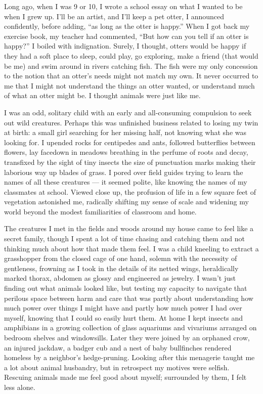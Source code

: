 Long ago, when I was 9 or 10, I wrote a school essay on what I wanted to
be when I grew up. I'll be an artist, and I'll keep a pet otter, I
announced confidently, before adding, ``as long as the otter is happy.''
When I got back my exercise book, my teacher had commented, ``But how
can you tell if an otter is happy?'' I boiled with indignation. Surely,
I thought, otters would be happy if they had a soft place to sleep,
could play, go exploring, make a friend (that would be me) and swim
around in rivers catching fish. The fish were my only concession to the
notion that an otter's needs might not match my own. It never occurred
to me that I might not understand the things an otter wanted, or
understand much of what an otter might be. I thought animals were just
like me.

I was an odd, solitary child with an early and all-consuming compulsion
to seek out wild creatures. Perhaps this was unfinished business related
to losing my twin at birth: a small girl searching for her missing half,
not knowing what she was looking for. I upended rocks for centipedes and
ants, followed butterflies between flowers, lay facedown in meadows
breathing in the perfume of roots and decay, transfixed by the sight of
tiny insects the size of punctuation marks making their laborious way up
blades of grass. I pored over field guides trying to learn the names of
all these creatures --- it seemed polite, like knowing the names of my
classmates at school. Viewed close up, the profusion of life in a few
square feet of vegetation astonished me, radically shifting my sense of
scale and widening my world beyond the modest familiarities of classroom
and home.

The creatures I met in the fields and woods around my house came to feel
like a secret family, though I spent a lot of time chasing and catching
them and not thinking much about how that made them feel. I was a child
kneeling to extract a grasshopper from the closed cage of one hand,
solemn with the necessity of gentleness, frowning as I took in the
details of its netted wings, heraldically marked thorax, abdomen as
glossy and engineered as jewelry. I wasn't just finding out what animals
looked like, but testing my capacity to navigate that perilous space
between harm and care that was partly about understanding how much power
over things I might have and partly how much power I had over myself,
knowing that I could so easily hurt them. At home I kept insects and
amphibians in a growing collection of glass aquariums and vivariums
arranged on bedroom shelves and windowsills. Later they were joined by
an orphaned crow, an injured jackdaw, a badger cub and a nest of baby
bullfinches rendered homeless by a neighbor's hedge-pruning. Looking
after this menagerie taught me a lot about animal husbandry, but in
retrospect my motives were selfish. Rescuing animals made me feel good
about myself; surrounded by them, I felt less alone.

